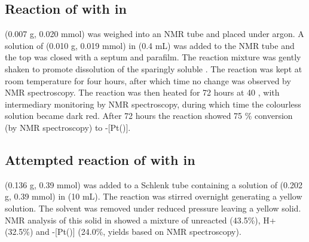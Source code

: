 
\subsection*{Reaction of \tButhixantphos{} with \ce{[Pt(C6H10)Cl2]} in }

\ce{[Pt(C6H10)Cl2]} (0.007 g, 0.020 mmol) was weighed into an NMR tube and placed under argon.  A solution of \tButhixantphos{} (0.010 g, 0.019 mmol) in  (0.4 mL) was added to the NMR tube and the top was closed with a septum and parafilm.  The reaction mixture was gently shaken to promote dissolution of the sparingly soluble \ce{[Pt(C6H10)Cl2]}.  The reaction was kept at room temperature for four hours, after which time no change was observed by NMR spectroscopy.  The reaction was then heated for 72 hours at 40 \degC, with intermediary monitoring by NMR spectroscopy, during which time the colourless solution became dark red.  After 72 hours the reaction showed 75 \% conversion (by \phosphorus{} NMR spectroscopy) to \trans-[Pt(\tBuxantphos)].

\subsection*{Attempted reaction of \tButhixantphos{} with \ce{[Pt(C6H10)Cl2]} in }

\ce{[Pt(C6H10)Cl2]} (0.136 g, 0.39 mmol) was added to a Schlenk tube containing a solution of  \tButhixantphos{} (0.202 g, 0.39 mmol) in  (10 mL).  The reaction was stirred overnight generating a yellow solution.  The solvent was removed under reduced pressure leaving a yellow solid.  NMR analysis of this solid in  showed a mixture of unreacted \tButhixantphos{} (43.5\%), \tButhixantphos H+ (32.5\%) and \trans-[Pt(\tButhixantphos)] (24.0\%, yields based on \phosphorus{} NMR spectroscopy).  


